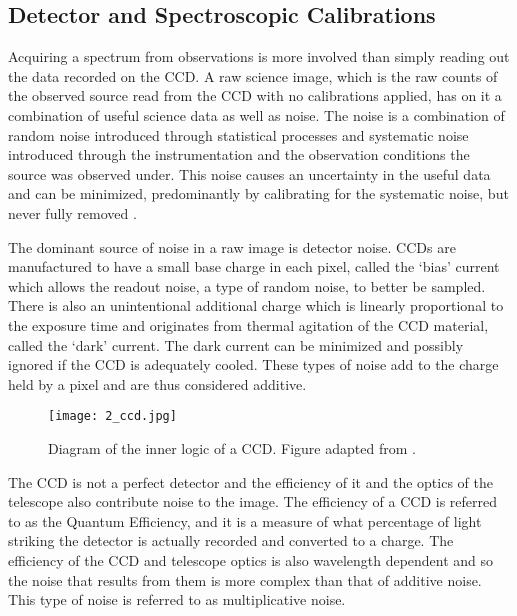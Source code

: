 \subsection{Detector and Spectroscopic Calibrations} \label{subsec:calibration}

Acquiring a spectrum from observations is more involved than simply reading out the data recorded on the \gls{CCD}.
A raw science image, which is the raw counts of the observed source read from the \gls{CCD} with no calibrations applied, has on it a combination of useful science data as well as noise.
The noise is a combination of random noise introduced through statistical processes and systematic noise introduced through the instrumentation and the observation conditions the source was observed under.
This noise causes an uncertainty in the useful data and can be minimized, predominantly by calibrating for the systematic noise, but never fully removed \citep{CCDhandbook}.

The dominant source of noise in a raw image is detector noise.
\glspl{CCD} are manufactured to have a small base charge in each pixel, called the `bias' current which allows the readout noise, a type of random noise, to better be sampled.
There is also an unintentional additional charge which is linearly proportional to the exposure time and originates from thermal agitation of the \gls{CCD} material, called the `dark' current.
The dark current can be minimized and possibly ignored if the \gls{CCD} is adequately cooled.
These types of noise add to the charge held by a pixel and are thus considered additive.

\begin{figure}[t]
    \centering
    \texttt{[image: 2\_ccd.jpg]}
    \caption{
        Diagram of the inner logic of a \gls{CCD}.
        Figure adapted from \cite{ccd_fig}.
    }
    \label{fig:ccd_diagram}
\end{figure}

The \gls{CCD} is not a perfect detector and the efficiency of it and the optics of the telescope also contribute noise to the image.
The efficiency of a \gls{CCD} is referred to as the Quantum Efficiency, and it is a measure of what percentage of light striking the detector is actually recorded and converted to a charge.
The efficiency of the \gls{CCD} and telescope optics is also wavelength dependent and so the noise that results from them is more complex than that of additive noise.
This type of noise is referred to as multiplicative noise.

